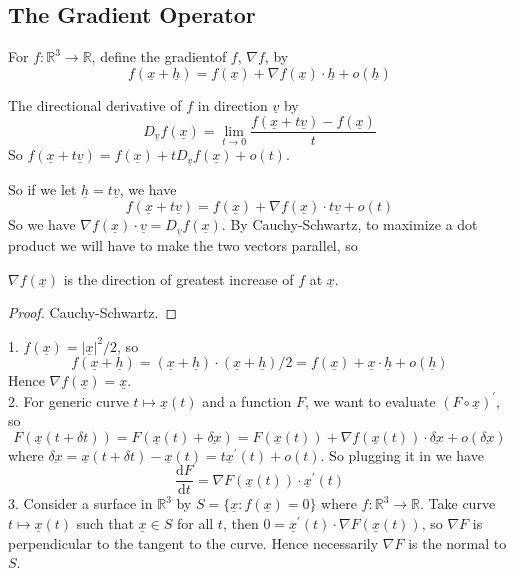 \subsection{The Gradient Operator}
For $f:\mathbb R^3\to\mathbb R$, define the gradientof $f$, $\nabla f$, by
$$f(\underline{x}+\underline{h})=f(\underline{x})+\nabla f(\underline{x})\cdot\underline{h}+o(\underline{h})$$
\begin{definition}
    The directional derivative of $f$ in direction $\underline{v}$ by
    $$D_{\underline{v}}f(\underline{x})=\lim_{t\to 0}\frac{f(\underline{x}+t\underline{v})-f(\underline{x})}{t}$$
    So $f(\underline{x}+t\underline{v})=f(\underline{x})+tD_{\underline{v}}f(\underline{x})+o(t)$.
\end{definition}
So if we let $\underline{h}=t\underline{v}$, we have
$$f(\underline{x}+t\underline{v})=f(\underline{x})+\nabla f(\underline{x})\cdot t\underline{v}+o(t)$$
So we have $\nabla f(\underline{x})\cdot \underline{v}=D_{\underline{v}}f(\underline{x})$.
By Cauchy-Schwartz, to maximize a dot product we will have to make the two vectors parallel, so
\begin{proposition}
    $\nabla f(\underline{x})$ is the direction of greatest increase of $f$ at $\underline{x}$.
\end{proposition}
\begin{proof}
    Cauchy-Schwartz.
\end{proof}
\begin{example}
    1. $f(\underline{x})=|\underline{x}|^2/2$, so
    $$f(\underline{x}+\underline{h})=(\underline{x}+\underline{h})\cdot(\underline{x}+\underline{h})/2=f(\underline{x})+\underline{x}\cdot\underline{h}+o(\underline{h})$$
    Hence $\nabla f(\underline{x})=\underline{x}$.\\
    2. For generic curve $t\mapsto \underline{x}(t)$ and a function $F$, we want to evaluate $(F\circ \underline{x})^\prime$, so
    $$F(\underline{x}(t+\delta t))=F(\underline{x}(t)+\underline{\delta x})=F(\underline{x}(t))+\nabla f(\underline{x}(t))\cdot\underline{\delta x}+o(\underline{\delta x})$$
    where $\underline{\delta x}=\underline{x}(t+\delta t)-\underline{x}(t)=t\underline{x}^\prime(t)+o(t)$.
    So plugging it in we have
    $$\frac{\mathrm dF}{\mathrm dt}=\nabla F(\underline{x}(t))\cdot \underline{x}^\prime(t)$$
    3. Consider a surface in $\mathbb R^3$ by $S=\{\underline{x}:f(\underline{x})=0\}$ where $f:\mathbb R^3\to\mathbb R$.
    Take curve $t\mapsto \underline{x}(t)$ such that $\underline{x}\in S$ for all $t$, then $0=\underline{x}^\prime(t)\cdot\nabla F(\underline{x}(t))$, so $\nabla F$ is perpendicular to the tangent to the curve.
    Hence necessarily $\nabla F$ is the normal to $S$.
\end{example}
